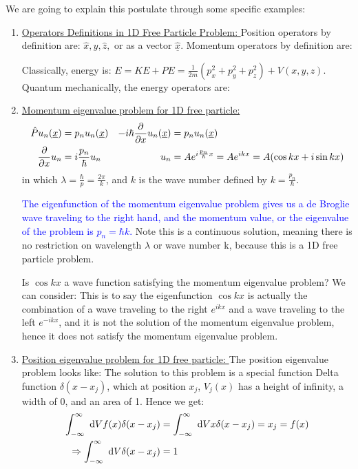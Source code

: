 \documentclass{school-22.101-notes}
\begin{document}
We are going to explain this postulate through some specific examples:
\begin{enumerate}
\item \uline{Operators Definitions in 1D Free Particle Problem: } Position operators by definition are: $\hat{x}, \hat{y}, \hat{z},$ or as a vector $\hat{\underline{x}}$. Momentum operators by definition are:

Classically, energy is: $E = KE + PE = \frac{1}{2m} (p_x^2 + p_y^2 + p_z^2) + V(x,y,z)$. Quantum mechanically, the energy operators are:

\item \uline{Momentum eigenvalue problem for 1D free particle: }
\begin{align}
\hat{P} u_n(\underline{x}) &= p_n u_n(\underline{x}) & -i\hbar \frac{\partial}{\partial x} u_n(\underline{x}) &= p_n u_n(\underline{x}) \\
\frac{\partial}{\partial x} u_n &= i \frac{p_n}{\hbar} u_n   & u_n &= A e^{i \frac{p_n}{\hbar} x} = A e^{ikx} = A (\cos kx + i \sin kx) 
\end{align}
in which $\lambda = \frac{\hbar}{p} = \frac{2\pi}{k}$, and $k$ is the wave number defined by $k = \frac{p_n}{\hbar}$.

\textcolor{blue}{The eigenfunction of the momentum eigenvalue problem gives us a de Broglie wave traveling to the right hand, and the momentum value, or the eigenvalue of the problem is $p_n = \hbar k$.} Note this is a continuous solution, meaning there is no restriction on wavelength $\lambda$ or wave number k, because this is a 1D free particle problem. 

Is $\cos kx$ a wave function satisfying the momentum eigenvalue problem? We can consider:
This is to say the eigenfunction $\cos kx$ is actually the combination of a wave traveling to the right $e^{ikx}$ and a wave traveling to the left $e^{-ikx}$, and it is not the solution of the momentum eigenvalue problem, hence it does not satisfy the momentum eigenvalue problem. 


\item \uline{Position eigenvalue problem for 1D free particle: }
The position eigenvalue problem looks like:
The solution to this problem is a special function Delta function $\delta (x - x_j)$, which at position $x_j$, $V_j(x)$ has a height of infinity, a width of 0, and an area of 1. Hence we get:
\begin{align}
\int_{-\infty}^{\infty} \mbox{ }\mathrm{d} V f(x) \delta(x-x_j) &=  \int_{-\infty}^{\infty} \mbox{ }\mathrm{d} V x \delta(x-x_j) = x_j = f(x) \\
\Rightarrow \int_{-\infty}^{\infty} \mbox{ }\mathrm{d} V \delta(x-x_j) &= 1 
\end{align}



\end{enumerate}
\end{document}
